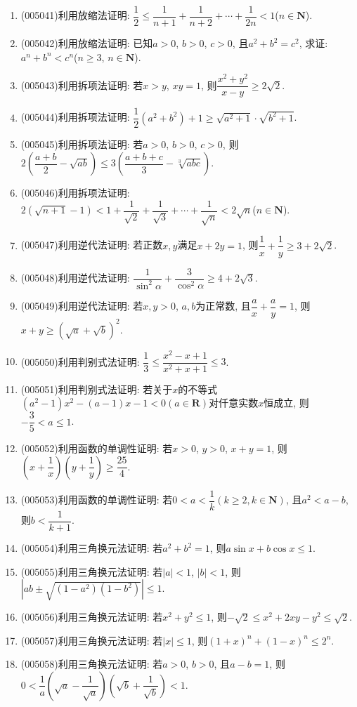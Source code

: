 \documentclass[10pt,a4paper]{article}
\begin{document}
\begin{enumerate}[1.]
\item {\tiny (005041)}利用放缩法证明: $\dfrac 12\le \dfrac 1{n+1}+\dfrac 1{n+2}+\cdots +\dfrac 1{2n}<1$($n\in \mathbf{N}$).
\item {\tiny (005042)}利用放缩法证明: 已知$a>0$, $b>0$, $c>0$, 且$a^2+b^2=c^2$, 求证: $a^n+b^n<c^n$($n\ge 3$, $n\in \mathbf{N}$).
\item {\tiny (005043)}利用拆项法证明: 若$x>y$, $xy=1$, 则$\dfrac{x^2+y^2}{x-y}\ge 2\sqrt 2$.
\item {\tiny (005044)}利用拆项法证明: $\dfrac 12({a^2}+{b^2})+1\ge \sqrt{{a^2}+1}\cdot \sqrt{{b^2}+1}$.
\item {\tiny (005045)}利用拆项法证明: 若$a>0$, $b>0$, $c>0$, 则$2(\dfrac{a+b}2-\sqrt{ab})\le 3(\dfrac{a+b+c}3-\sqrt[3]{abc})$.
\item {\tiny (005046)}利用拆项法证明: $2(\sqrt{n+1}-1)<1+\dfrac 1{\sqrt 2}+\dfrac 1{\sqrt 3}+\cdots +\dfrac 1{\sqrt n}<2\sqrt n$($n\in \mathbf{N}$).
\item {\tiny (005047)}利用逆代法证明: 若正数$x,y$满足$x+2y=1$, 则$\dfrac 1x+\dfrac 1y\ge 3+2\sqrt 2$.
\item {\tiny (005048)}利用逆代法证明: $\dfrac 1{\sin ^2\alpha}+\dfrac 3{\cos^2\alpha}\ge 4+2\sqrt 3$.
\item {\tiny (005049)}利用逆代法证明: 若$x,y>0$, $a,b$为正常数, 且$\dfrac ax+\dfrac ay=1$, 则$x+y\ge (\sqrt a+\sqrt b)^2$.
\item {\tiny (005050)}利用判别式法证明: $\dfrac 13\le \dfrac{x^2-x+1}{x^2+x+1}\le 3$.
\item {\tiny (005051)}利用判别式法证明: 若关于$x$的不等式$(a^2-1)x^2-(a-1)x-1<0(a\in \mathbf{R})$对仟意实数$x$恒成立, 则$-\dfrac 35<a\le 1$.
\item {\tiny (005052)}利用函数的单调性证明: 若$x>0$, $y>0$, $x+y=1$, 则$(x+\dfrac 1x)(y+\dfrac 1y)\ge \dfrac{25}4$.
\item {\tiny (005053)}利用函数的单调性证明: 若$0<a<\dfrac 1k(k\ge 2,k\in \mathbf{N})$, 且$a^2<a-b$, 则$b<\dfrac 1{k+1}$.
\item {\tiny (005054)}利用三角换元法证明: 若$a^2+b^2=1$, 则$a\sin x+b\cos x\le 1$.
\item {\tiny (005055)}利用三角换元法证明: 若$|a|<1$, $|b|<1$, 则$|ab\pm \sqrt{(1-{a^2})(1-{b^2})}|\le 1$.
\item {\tiny (005056)}利用三角换元法证明: 若$x^2+y^2\le 1$, 则$-\sqrt 2\le x^2+2xy-y^2\le \sqrt 2$.
\item {\tiny (005057)}利用三角换元法证明: 若$|x|\le 1$, 则$(1+x)^n+(1-x)^n\le 2^n$.
\item {\tiny (005058)}利用三角换元法证明: 若$a>0$, $b>0$, 且$a-b=1$, 则$0<\dfrac 1a(\sqrt a-\dfrac 1{\sqrt a})(\sqrt b+\dfrac 1{\sqrt b})<1$.

\end{enumerate}
\end{document}
